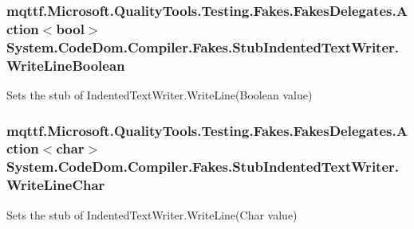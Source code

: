 \hypertarget{class_system_1_1_code_dom_1_1_compiler_1_1_fakes_1_1_stub_indented_text_writer_a81e13506f150fe972864ea1c0ac7313f}{
\subsubsection[{Write\-Line\-Boolean}]{\setlength{\rightskip}{0pt plus 5cm}mqttf.\-Microsoft.\-Quality\-Tools.\-Testing.\-Fakes.\-Fakes\-Delegates.\-Action$<$bool$>$ System.\-Code\-Dom.\-Compiler.\-Fakes.\-Stub\-Indented\-Text\-Writer.\-Write\-Line\-Boolean}}\label{class_system_1_1_code_dom_1_1_compiler_1_1_fakes_1_1_stub_indented_text_writer_a81e13506f150fe972864ea1c0ac7313f}


Sets the stub of Indented\-Text\-Writer.\-Write\-Line(\-Boolean value)

\hypertarget{class_system_1_1_code_dom_1_1_compiler_1_1_fakes_1_1_stub_indented_text_writer_af91ea73c558a75fb23cfa6e8846e21cf}{
\subsubsection[{Write\-Line\-Char}]{\setlength{\rightskip}{0pt plus 5cm}mqttf.\-Microsoft.\-Quality\-Tools.\-Testing.\-Fakes.\-Fakes\-Delegates.\-Action$<$char$>$ System.\-Code\-Dom.\-Compiler.\-Fakes.\-Stub\-Indented\-Text\-Writer.\-Write\-Line\-Char}}\label{class_system_1_1_code_dom_1_1_compiler_1_1_fakes_1_1_stub_indented_text_writer_af91ea73c558a75fb23cfa6e8846e21cf}


Sets the stub of Indented\-Text\-Writer.\-Write\-Line(\-Char value)

